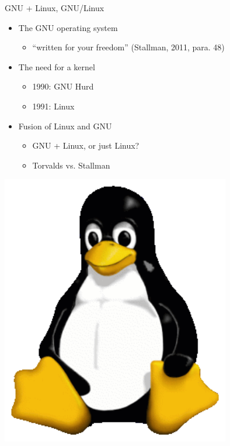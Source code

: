 \begin{frame}{GNU + Linux, GNU/Linux}
\begin{minipage}{0.5\textwidth}
\begin{itemize}
  \item The GNU operating system
    \begin{itemize}
    \item ``written for your freedom'' (Stallman, 2011, para. 48) 
    \end{itemize}    
  \item The need for a kernel
    \begin{itemize}
      \item 1990: GNU Hurd
      \item 1991: Linux
     \end{itemize}
  \item Fusion of Linux and GNU
    \begin {itemize}
      \item GNU + Linux, or just Linux?
      \item Torvalds vs. Stallman
    \end{itemize}
\end{itemize}
\end{minipage}
\begin{minipage}{0.45\textwidth}
\includegraphics[width = 0.75\textwidth]{tux.png}

\end{minipage}
\end{frame}
